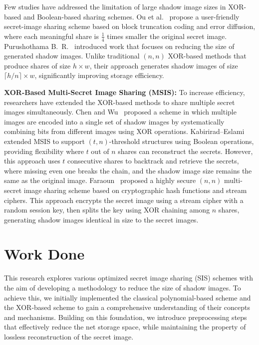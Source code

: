 Few studies have addressed the limitation of large shadow image sizes in XOR-based and Boolean-based sharing schemes. Ou et al.~\cite{ou2015userfriendly} propose a user-friendly secret-image sharing scheme based on block truncation coding and error diffusion, where each meaningful share is $\frac{1}{4}$ times smaller the original secret image. Purushothama B.~R.~\cite{purushothama2024} introduced work that focuses on reducing the size of generated shadow images. Unlike traditional $(n, n)$ XOR-based methods that produce shares of size $h \times w$, their approach generates shadow images of size $\lceil h/n \rceil \times w$, significantly improving storage efficiency.
 
\textbf{XOR-Based Multi-Secret Image Sharing (MSIS):} To increase efficiency, researchers have extended the XOR-based methods to share multiple secret images simultaneously. Chen and Wu~\cite{chen2011} proposed a scheme in which multiple images are encoded into a single set of shadow images by systematically combining bits from different images using XOR operations. Kabirirad--Eslami~\cite{kabirirad2018t} extended MSIS to support $(t, n)$-threshold structures using Boolean operations, providing flexibility where $t$ out of $n$ shares can reconstruct the secrets. However, this approach uses $t$ consecutive shares to backtrack and retrieve the secrets, where missing even one breaks the chain, and the shadow image size remains the same as the original image. Faraoun~\cite{faraoun2020} proposed a highly secure $(n, n)$ multi-secret image sharing scheme based on cryptographic hash functions and stream ciphers. This approach encrypts the secret image using a stream cipher with a random session key, then splits the key using XOR chaining among $n$ shares, generating shadow images identical in size to the secret images.
 
\section{Work Done}
 
This research explores various optimized secret image sharing (SIS) schemes with the aim of developing a methodology to reduce the size of shadow images. To achieve this, we initially implemented the classical polynomial-based scheme and the XOR-based scheme to gain a comprehensive understanding of their concepts and mechanisms. Building on this foundation, we introduce preprocessing steps that effectively reduce the net storage space, while maintaining the property of lossless reconstruction of the secret image.
 
